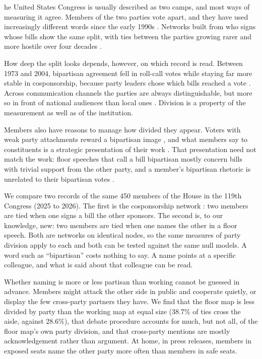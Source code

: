 
he United States Congress is usually described as two camps, and most ways of measuring it agree.
Members of the two parties vote apart, and they have used increasingly different words since the early 1990s
\cite{gentzkow2019}. Networks built from who signs whose bills show the same split, with ties between the parties
growing rarer and more hostile over four decades \cite{neal2020}.

How deep the split looks depends, however, on which record is read. Between 1973 and 2004, bipartisan agreement
fell in roll-call votes while staying far more stable in cosponsorship, because party leaders chose which bills
reached a vote \cite{harbridge2015}. Across communication channels the parties are always distinguishable, but more
so in front of national audiences than local ones \cite{green2024}. Division is a property of the measurement as
well as of the institution.

Members also have reasons to manage how divided they appear. Voters with weak party attachments reward a
bipartisan image \cite{harbridge2011}, and what members say to constituents is a strategic presentation of their
work \cite{grimmer2013}. That presentation need not match the work: floor speeches that call a bill bipartisan
mostly concern bills with trivial support from the other party, and a member's bipartisan rhetoric is unrelated to
their bipartisan votes \cite{westwood2022}.

We compare two records of the same 450 members of the House in the 119th Congress (2025 to 2026). The first is the
cosponsorship network \cite{fowler2006}: two members are tied when one signs a bill the other sponsors. The second
is, to our knowledge, new: two members are tied when one names the other in a floor speech. Both are networks on
identical nodes, so the same measures of party division apply to each and both can be tested against the same
null models. A word such as ``bipartisan'' costs nothing to say. A name points at a specific colleague, and what is
said about that colleague can be read.

Whether naming is more or less partisan than working cannot be guessed in advance. Members might attack the other
side in public and cooperate quietly, or display the few cross-party partners they have. We find that the floor map
is less divided by party than the working map at equal size (38.7\% of ties cross the aisle, against 28.6\%), that
debate procedure accounts for much, but not all, of the floor map's own party division, and that cross-party mentions are mostly
acknowledgement rather than argument. At home, in press releases, members in exposed seats name the other party
more often than members in safe seats.
